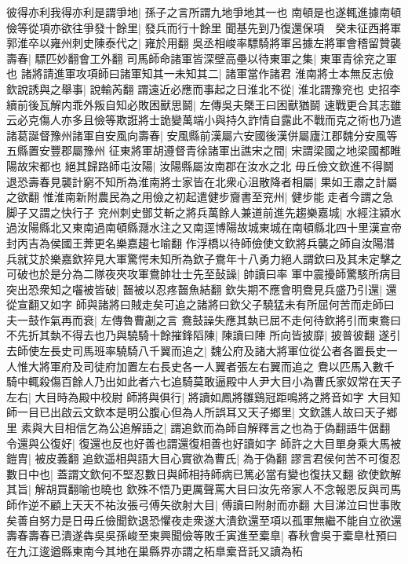 彼得亦利我得亦利是謂爭地|{
	孫子之言所謂九地爭地其一也}
南頓是也遂輒進據南頓儉等從項亦欲往爭發十餘里|{
	發兵而行十餘里}
聞基先到乃復還保項　癸未征西將軍郭淮卒以雍州刺史陳泰代之|{
	雍於用翻}
吳丞相峻率驃騎將軍呂據左將軍會稽留贊襲壽春|{
	驃匹妙翻會工外翻}
司馬師命諸軍皆深壁高壘以待東軍之集|{
	東軍青徐兖之軍也}
諸將請進軍攻項師曰諸軍知其一未知其二|{
	諸軍當作諸君}
淮南將士本無反志儉欽說誘與之舉事|{
	說輸芮翻}
謂遠近必應而事起之日淮北不從|{
	淮北謂豫兖也}
史招李續前後瓦解内乖外叛自知必敗困獸思鬬|{
	左傳吳夫槩王曰困獸猶鬬}
速戰更合其志雖云必克傷人亦多且儉等欺誑將士詭變萬端小與持久詐情自露此不戰而克之術也乃遣諸葛誕督豫州諸軍自安風向壽春|{
	安風縣前漢屬六安國後漢併屬廬江郡魏分安風等五縣置安豐郡屬豫州}
征東將軍胡遵督青徐諸軍出譙宋之間|{
	宋謂梁國之地梁國都睢陽故宋都也}
絕其歸路師屯汝陽|{
	汝陽縣屬汝南郡在汝水之北}
毋丘儉文欽進不得鬬退恐壽春見襲計窮不知所為淮南將士家皆在北衆心沮散降者相屬|{
	果如王肅之計屬之欲翻}
惟淮南新附農民為之用儉之初起遣健步齎書至兖州|{
	健步能走者今謂之急脚子又謂之快行子}
兖州刺史鄧艾斬之將兵萬餘人兼道前進先趨樂嘉城|{
	水經注潁水過汝陽縣北又東南過南頓縣㶏水注之又南逕博陽故城東城在南頓縣北四十里漢宣帝封丙吉為侯國王莾更名樂嘉趨七喻翻}
作浮橋以待師儉使文欽將兵襲之師自汝陽潛兵就艾於樂嘉欽猝見大軍驚愕未知所為欽子鴦年十八勇力絕人謂欽曰及其未定擊之可破也於是分為二隊夜夾攻軍鴦帥壮士先至鼔譟|{
	帥讀曰率}
軍中震擾師驚駭所病目突出恐衆知之囓被皆破|{
	齧被以忍疼齧魚結翻}
欽失期不應會明鴦見兵盛乃引還|{
	還從宣翻又如字}
師與諸將曰賊走矣可追之諸將曰欽父子驍猛未有所屈何苦而走師曰夫一鼓作氣再而衰|{
	左傳魯曹劌之言}
鴦鼓譟失應其埶已屈不走何待欽將引而東鴦曰不先折其埶不得去也乃與驍騎十餘摧鋒䧟陳|{
	陳讀曰陣}
所向皆披靡|{
	披普彼翻}
遂引去師使左長史司馬班率驍騎八千翼而追之|{
	魏公府及諸大將軍位從公者各置長史一人惟大將軍府及司徒府加置左右長史各一人翼者張左右翼而追之}
鴦以匹馬入數千騎中輒殺傷百餘人乃出如此者六七追騎莫敢逼殿中人尹大目小為曹氏家奴常在天子左右|{
	大目時為殿中校尉}
師將與俱行|{
	將讀如鳳將雛鷄冠距鳴將之將音如字}
大目知師一目已出啟云文欽本是明公腹心但為人所誤耳又天子鄉里|{
	文欽譙人故曰天子鄉里}
素與大目相信乞為公追解語之|{
	謂追欽而為師自解釋言之也為于偽翻語牛倨翻}
令還與公復好|{
	復還也反也好善也謂還復相善也好讀如字}
師許之大目單身乘大馬被鎧胄|{
	被皮義翻}
追欽遥相與語大目心實欲為曹氏|{
	為于偽翻}
謬言君侯何苦不可復忍數日中也|{
	蓋謂文欽何不堅忍數日與師相持師病已篤必當有變也復扶又翻}
欲使欽解其旨|{
	解胡買翻喻也曉也}
欽殊不悟乃更厲聲罵大目曰汝先帝家人不念報恩反與司馬師作逆不顧上天天不祐汝張弓傅矢欲射大目|{
	傅讀曰附射而亦翻}
大目涕泣曰世事敗矣善自努力是日毋丘儉聞欽退恐懼夜走衆遂大潰欽還至項以孤軍無繼不能自立欲還壽春壽春已潰遂犇吳吳孫峻至東興聞儉等敗壬寅進至槖臯|{
	春秋會吳于槖臯杜預曰在九江逡遒縣東南今其地在巢縣界亦謂之柘臯槖音託又讀為柘}
